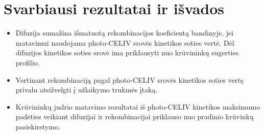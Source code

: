 \section{Svarbiausi rezultatai ir išvados}
\begin{itemize}
\item Difuzija sumažina išmatuotą rekombinacijos koeficientą bandinyje, jei matavimui naudojama photo-CELIV srovės kinetikos soties vertė. Dėl difuzijos kinetikos soties srovė ima priklausyti nuo krūvininkų sugerties profilio.
\item Vertinant rekombinaciją pagal photo-CELIV srovės kinetikos soties vertę privalu atsižvelgti į užlaikymo trukmės įtaką.
\item Krūvininkų judrio matavimo rezultatai iš photo-CELIV kinetikos maksimumo padėties veikiant difuzijai ir rekombinacijai priklauso nuo pradinio krūvinkų pasiskirstymo.
\end{itemize} 
